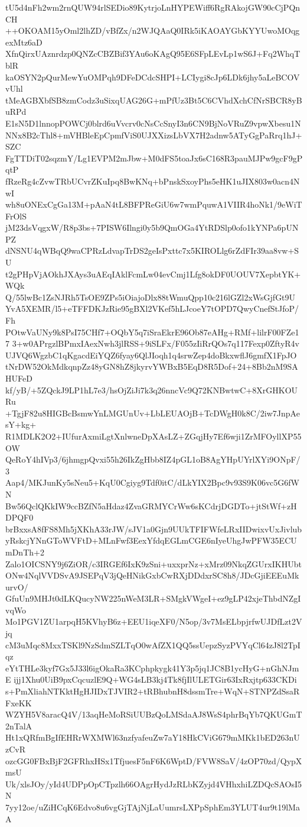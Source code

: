tU5d4nFh2wm2rnQUW94rlSEDio89KytrjoLnHYPEWiff6RgRAkojGW90cCjPQnCH
++OKOAM15yOml2lhZD/vBfZx/n2WJQAaQ0IRk5iKAOAYGbKYYUwoMOqgexMtz6aD
XfnQirxUAznrdzp0QNZcCBZBif3YAu6oKAgQ95E6SFpLEvLp1wS6J+Fq2WhqTblR
kaOSYN2pQurMewYuOMPqh9DFeDCdcSHPI+LCIygi8cJp6LDk6jhy5aLeBCOVvUhl
tMeAGBXbfSB8zmCodz3uSixqUAG26G+mPfUz3Bt5C6CVhdXchCfNrSBCR8yBuRPd
E1sN5D1lnnopPOWCj0blrd6uVvcrv0cNsCcSnyI3n6CN9BjNoVRuZ9vpwXbesu1N
NNx8B2cThl8+mVHBleEpCpmfViS0UJXXizsLbVX7H2adnw5ATyGgPaRrq1hJ+SZC
FgTTDiT02sqzmY/Lg1EVPM2mJbw+M0dFS5toaJx6sC168R3pauMJPw9gcF9gPqtP
fRzeRg4cZvwTRbUCvrZKuIpq8BwKNq+bPnskSxoyPhs5eHK1uJIX803w0acn4NwI
wh8uONExCgGa13M+pAaN4tL8BFPReGiU6w7wmPquwA1VIIR4hoNk1/9eWiTFrOlS
jM23dsVqgxW/R8p3bs+7PISW6Ilngi0y5b9QmOGa4YtRDSlp0ofo1kYNPa6pUNPZ
dNSNU4qWBqQ9waCPRzLdvapTrDS2geIsPxttc7x5KIROLlg6rZdFIr39aa8vw+SU
t2gPHpVjAOkhJXAys3uAEqIAklFcmLw04evCmj1Lfg8okDF0UOUV7XepbtYK+WQk
Q/55lwBc1ZsNJRh5TsOE9ZPs5iOiajoDlx88tWmuQpp10c216lGZl2xWsGjfGt9U
YvA5XEMR/l5+eTFFDKJzRie95gBXl2VKef5hLJcoeY7tOPD7QwyCnefStJfoP/Fh
POtwVaUNy9k8PsI75CHf7+OQbY5q7iSraEkrE96Ob87eAHg+RMf+lilrF00FZe17
3+w0APrgzlBPmxIAexNwh3jlRSS+9iSLFx/F055zIiRrQOs7q117Fexp0ZftyR4v
UJVQ6WgzbC1qKgacdEiYQZ6fyay6QlJIoqh1q4srwZep4doBkxwflJ6gmfX1FpJO
tNrDW52OkMdkqnpZz48yGN8hZ8jkyrvYWBxB5EqD8R5Dof+24+8Bb2nM9SAHUFeD
kf/yB/+5ZQckJ9LP1hL7e3/hsOjZiJi7k3q26nncVc9Q72KNBwtwC+8XrGHKOURu
+TgjF82u8HIGBcBsmwYnLMGUnUv+LbLEUAOjB+TcDWgH0k8C/2iw7JnpAesY+kg+
R1MDLK2O2+IUfurAxmiLgtXnlwneDpXAsLZ+ZGqjHy7Ef6wji1ZrMFOyllXP55OW
QeRoY4hIVp3/6jhmgpQvxi55h26IkZgHbb8IZ4pGL1oB8AgYHpUYrlXYi9ONpF/3
Aap4/MKJunKy5sNeu5+KqU0Cgiyg9Tdf0itC/dLkYIX2Bpc9v93S9K06vc5G6fWN
Bw56QclQKkIW9ccBZfN5aHdaz4ZvaGRMYCrWw6sKCdrjDGDTo+jtStWf+zHDPQF0
brBxxsA8fFS8Mh5jXKhA33rJW/sJV1a0Gjn9UUkTFIFWfeLRxIIDwixvUxJivlub
yRskcjYNnGToWVFtD+MLnFwf3EexYfdqEGLmCGE6nIyeUhgJwPFW35ECUmDnTh+2
Zalo1OICSNY9j6ZiOR/c3IRGEf6IxK9zSni+uxxprNz+xMrz09NkqZGUrxIKHUbt
ONw4NqlVVDSvA9JSEPqV3jQeHNikGxbCwRXjDDdxrSC8h8/JDcGjiEEEuMkurvO/
GfuUn9MHJt0dLKQucyNW225nWeM3LR+SMgkVWgeI+ez9gLP42xjeThbdNZgIvqWo
Mo1PGV1ZU1arpqH5KVhyB6z+EEU1iqeXF0/N5op/3v7MsELbpjrfwUJDfLzt2Vjq
cM3uMqc8MxxTSKl9NzSdmSZLTqO0wAfZX1QQ5ssUepzSyzPVYqCl64zJ8l2TpIqz
eYtTHLe3kyf7Gx5J33l6igOkaRa3KCphpkygk41Y3p5jq1JC8B1ycHyG+nGhNJmE
ijj1Xhu0UiB9pxCqcuzlE9Q+WG4sLB3kj4Tk8fjIlULETGir63IxRxjtp633CKDi
s+PmXliahNTKktHgHJIDxTJVIR2+tRBhubnH8dssmTre+WqN+STNPZdSsaRFxeKK
WZYH5V8aracQ4V/13aqHeMoRSiUUBzQoLMSdaAJ8WsS4phrBqYb7QKUGmT2nTalA
Ht1xQRfmBgIfEHRrWXMWl63nzfyafeuZw7aY18HkCViG679mMKk1bED263nUzCvR
ozcGG0FBxBjF2GFRhxHSx1TfjuesF5nF6K6WptD/FVW8SaV/4zOP70zd/QypXmsU
Uk/xlsJOy/yId4UDPpOpCTpzlh66OAgrHydJzRLbKZyjd4VHhxhiLZDQcSAOsI5N
7yy12oe/uZiHCqK6Edvo8u6vgGjTAjNjLaUumrsLXPpSphEm3YLUT4ur9t19lMaA
